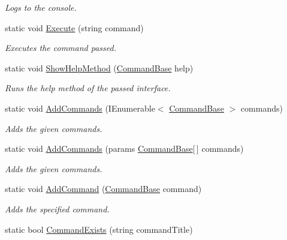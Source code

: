 \begin{DoxyCompactItemize}
\begin{DoxyCompactList}\small\item\em Logs to the console. \end{DoxyCompactList}\item 
static void \hyperlink{class_developer_console_1_1_dev_console_ae69b7bfc81cb59ea2ec6f6d0ccdb33e4}{Execute} (string command)
\begin{DoxyCompactList}\small\item\em Executes the command passed. \end{DoxyCompactList}\item 
static void \hyperlink{class_developer_console_1_1_dev_console_a90e83c2a48ec1d0b2d55cfc9d49f44e7}{Show\+Help\+Method} (\hyperlink{class_developer_console_1_1_core_1_1_command_base}{Command\+Base} help)
\begin{DoxyCompactList}\small\item\em Runs the help method of the passed interface. \end{DoxyCompactList}\item 
static void \hyperlink{class_developer_console_1_1_dev_console_a8772e0ab4d0a0e0813edfd34cded2012}{Add\+Commands} (I\+Enumerable$<$ \hyperlink{class_developer_console_1_1_core_1_1_command_base}{Command\+Base} $>$ commands)
\begin{DoxyCompactList}\small\item\em Adds the given commands. \end{DoxyCompactList}\item 
static void \hyperlink{class_developer_console_1_1_dev_console_a071a365e37266ddd90f6851490fc4c49}{Add\+Commands} (params \hyperlink{class_developer_console_1_1_core_1_1_command_base}{Command\+Base}\mbox{[}$\,$\mbox{]} commands)
\begin{DoxyCompactList}\small\item\em Adds the given commands. \end{DoxyCompactList}\item 
static void \hyperlink{class_developer_console_1_1_dev_console_a32e63d4fd5d3f05fea53a818c87dd52c}{Add\+Command} (\hyperlink{class_developer_console_1_1_core_1_1_command_base}{Command\+Base} command)
\begin{DoxyCompactList}\small\item\em Adds the specified command. \end{DoxyCompactList}\item 
static bool \hyperlink{class_developer_console_1_1_dev_console_a369547e22d3fcc7d2d6b90b7c6300a30}{Command\+Exists} (string command\+Title)

\end{DoxyCompactItemize}
